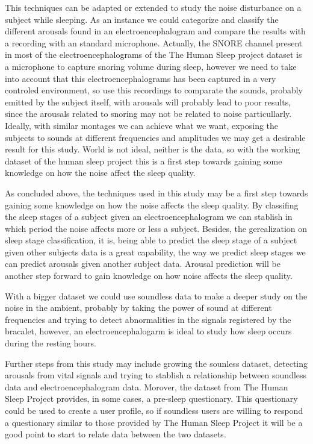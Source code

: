 This techniques can be adapted or extended to study the noise disturbance on a subject while sleeping. As an instance we could categorize and classify the different arousals found in an electroencephalogram and compare the results with a recording with an standard microphone. Actually, the SNORE channel present in most of the electroencephalograms of the The Human Sleep project dataset is a microphone to capture snoring volume during sleep, however we need to take into account that this electroencephalograms has been captured in a very controled environment, so use this recordings to comparate the sounds, probably emitted by the subject itself, with arousals will probably lead to poor results, since the arousals related to snoring may not be related to noise particullarly. Ideally, with similar montages we can achieve what we want, exposing the subjects to sounds at different frequencies and amplitudes we may get a desirable result for this study. World is not ideal, neither is the data, so with the working dataset of the human sleep project this is a first step towards gaining some knowledge on how the noise affect the sleep quality.

As concluded above, the techniques used in this study may be a first step towards gaining some knowledge on how the noise affects the sleep quality. By classifing the sleep stages of a subject given an electroencephalogram we can stablish in which period the noise affects more or less a subject. Besides, the gerealization on sleep stage classification, it is, being able to predict the sleep stage of a subject given other subjects data is a great capability, the way we predict sleep stages we can predict arousals given another subject data. Arousal prediction will be another step forward to gain knowledge on how noise affects the sleep quality. 

With a bigger dataset we could use soundless data to make a deeper study on the noise in the ambient, probably by taking the power of sound at different frequencies and trying to detect abnormalities in the signals registered by the bracalet, however, an electroencephalogarm is ideal to study how sleep occurs during the resting hours. 

Further steps from this study may include growing the sounless dataset, detecting arousals from vital signals and trying to stablish a relationship between soundless data and electroencephalogram data. Morover, the dataset from The Human Sleep Project provides, in some cases, a pre-sleep questionary. This questionary could be used to create a user profile, so if soundless users are willing to respond a questionary similar to those provided by The Human Sleep Project it will be a good point to start to relate data between the two datasets.  

